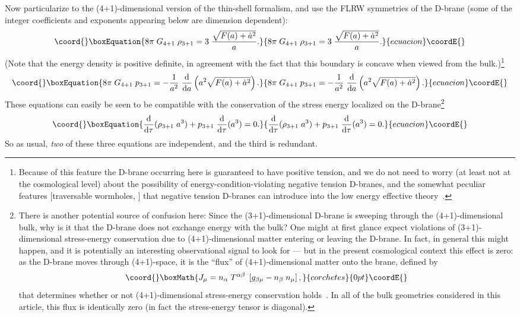 \documentclass[a4paper,12pt]{article}
\begin{document}
Now particularize to the (4+1)-dimensional version of the thin-shell
formalism, and use the FLRW symmetries of the D-brane (some of the
integer coefficients and exponents appearing below are dimension
dependent):
%
\begin{equation}\coord{}\boxEquation{
8\pi \; G_{4+1} \; \rho_{3+1} 
=  3  \; {\sqrt{F(a)+\dot a^2}\over a}.
}{
8\pi \; G_{4+1} \; \rho_{3+1} 
=  3  \; {\sqrt{F(a)+\dot a^2}\over a}.
}{ecuacion}\coordE{}\end{equation}
%
(Note that the energy density is positive definite, in agreement with
the fact that this boundary is concave when viewed from the
bulk.)\footnote{
Because of this feature the D-brane occurring here is guaranteed to
have positive tension, and we do not need to worry (at least not at
the cosmological level) about the possibility of
energy-condition-violating negative tension D-branes, and the somewhat
peculiar features [traversable wormholes, \etc] that negative tension
D-branes can introduce into the low energy effective
theory~\cite{Brane-surgery}.}
%
\begin{equation}\coord{}\boxEquation{
8\pi \; G_{4+1} \; p_{3+1}
=   - {1\over a^2}  
\; {\d\over\d a} \left(a^2 \sqrt{F(a)+\dot a^2} \right).
}{
8\pi \; G_{4+1} \; p_{3+1}
=   - {1\over a^2}  
\; {\d\over\d a} \left(a^2 \sqrt{F(a)+\dot a^2} \right).
}{ecuacion}\coordE{}\end{equation}
%
These equations can easily be seen to be compatible with the
conservation of the stress energy localized on the D-brane\footnote{
There is another potential source of confusion here: Since the
(3+1)-dimensional D-brane is sweeping through the (4+1)-dimensional
bulk, why is it that the D-brane does not exchange energy with the
bulk?  One might at first glance expect violations of
(3+1)-dimensional stress-energy conservation due to (4+1)-dimensional
matter entering or leaving the D-brane. In fact, in general this might
happen, and it is potentially an interesting observational signal to
look for --- but in the present cosmological context this effect is
zero: as the D-brane moves through (4+1)-space, it is the ``flux'' of
(4+1)-dimensional matter onto the brane, defined by
%
\[\coord{}\boxMath{
J_\mu = 
n_\alpha \; T^{\alpha\beta} \; \left[ g_{\beta \mu} - n_\beta \; n_\mu  \right],
}{corchetes}{0pt}\coordE{}\]
that determines whether or not (4+1)-dimensional stress-energy
conservation holds~\cite{Book}. In all of the bulk geometries
considered in this article, this flux is identically zero (in fact the
stress-energy tensor is diagonal).}
%
\begin{equation}\coord{}\boxEquation{
{\d\over\d\tau} (\rho_{3+1} \; a^3) + p_{3+1} \; {\d\over\d\tau} (a^3) = 0.
}{
{\d\over\d\tau} (\rho_{3+1} \; a^3) + p_{3+1} \; {\d\over\d\tau} (a^3) = 0.
}{ecuacion}\coordE{}\end{equation}
%
So as usual, {\em two} of these three equations are independent, 
and the third is redundant.
\end{document}
